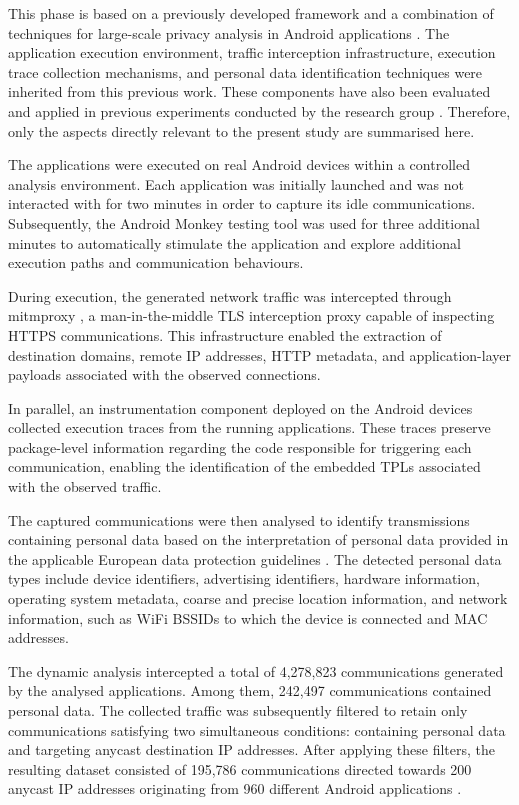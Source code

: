 This phase is based on a previously developed framework and a combination of techniques for large-scale privacy analysis in Android applications \cite{Guaman2023AutomatedApplications}. The application execution environment, traffic interception infrastructure, execution trace collection mechanisms, and personal data identification techniques were inherited from this previous work. These components have also been evaluated and applied in previous experiments conducted by the research group \cite{Guaman2021GDPRApps,Jain2023ATLAS:Labels,Guaman2023AutomatedApplications,Pascual2024Hunter:Transfers,Rodriguez2024LargeScale}. Therefore, only the aspects directly relevant to the present study are summarised here.

The applications were executed on real Android devices within a controlled analysis environment. Each application was initially launched and was not interacted with for two minutes in order to capture its idle communications. Subsequently, the Android Monkey testing tool \cite{IUDevelopers} was used for three additional minutes to automatically stimulate the application and explore additional execution paths and communication behaviours.

During execution, the generated network traffic was intercepted through mitmproxy \cite{MitmproxyProxy}, a man-in-the-middle TLS interception proxy capable of inspecting HTTPS communications. This infrastructure enabled the extraction of destination domains, remote IP addresses, HTTP metadata, and application-layer payloads associated with the observed connections.

In parallel, an instrumentation component deployed on the Android devices collected execution traces from the running applications. These traces preserve package-level information regarding the code responsible for triggering each communication, enabling the identification of the embedded TPLs associated with the observed traffic.

The captured communications were then analysed to identify transmissions containing personal data based on the interpretation of personal data provided in the applicable European data protection guidelines \cite{JUSTICEwp260rev.01}. The detected personal data types include device identifiers, advertising identifiers, hardware information, operating system metadata, coarse and precise location information, and network information, such as WiFi BSSIDs to which the device is connected and MAC addresses.

The dynamic analysis intercepted a total of 4,278,823 communications generated by the analysed applications. Among them, 242,497 communications contained personal data. The collected traffic was subsequently filtered to retain only communications satisfying two simultaneous conditions: containing personal data and targeting anycast destination IP addresses. After applying these filters, the resulting dataset consisted of 195,786 communications directed towards 200 anycast IP addresses originating from 960 different Android applications \cite{Pascual2025AnycastDisaster}.

